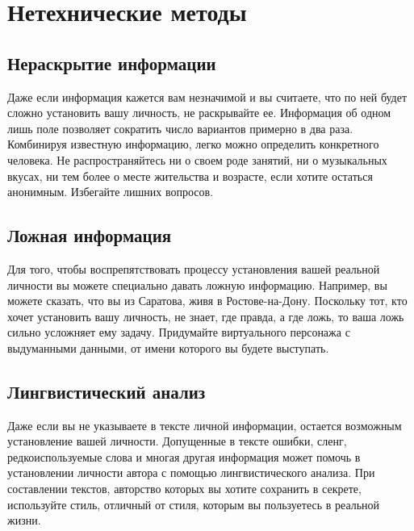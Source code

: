 \chapter{Нетехнические методы}
\section{Нераскрытие информации}
Даже если информация кажется вам незначимой и вы считаете, что по ней будет сложно установить вашу личность, не раскрывайте ее. Информация об одном лишь поле позволяет сократить число вариантов примерно в два раза. Комбинируя известную информацию, легко можно определить конкретного человека. Не распространяйтесь ни о своем роде занятий, ни о музыкальных вкусах, ни тем более о месте жительства и возрасте, если хотите остаться анонимным. Избегайте лишних вопросов.
\section{Ложная информация}
Для того, чтобы воспрепятствовать процессу установления вашей реальной личности вы можете специально давать ложную информацию. Например, вы можете сказать, что вы из Саратова, живя в Ростове-на-Дону. Поскольку тот, кто хочет установить вашу личность, не знает, где правда, а где ложь, то ваша ложь сильно усложняет ему задачу. Придумайте виртуального персонажа с выдуманными данными, от имени которого вы будете выступать.
\section{Лингвистический анализ}
Даже если вы не указываете в тексте личной информации, остается возможным установление вашей личности. Допущенные в тексте ошибки, сленг, редкоиспользуемые слова и многая другая информация может помочь в установлении личности автора с помощью лингвистического анализа. При составлении текстов, авторство которых вы хотите сохранить в секрете, используйте стиль, отличный от стиля, которым вы пользуетесь в реальной жизни.
